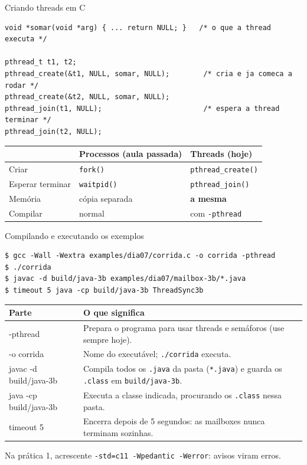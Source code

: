 \documentclass[aspectratio=169]{beamer}
\begin{document}
\begin{frame}[fragile]{Criando threads em C}
\begin{lstlisting}[style=codigo]
void *somar(void *arg) { ... return NULL; }   /* o que a thread executa */

pthread_t t1, t2;
pthread_create(&t1, NULL, somar, NULL);        /* cria e ja comeca a rodar */
pthread_create(&t2, NULL, somar, NULL);
pthread_join(t1, NULL);                        /* espera a thread terminar */
pthread_join(t2, NULL);
\end{lstlisting}

\begin{center}
\footnotesize
\begin{tabular}{@{}lll@{}}
\toprule
& \textbf{Processos (aula passada)} & \textbf{Threads (hoje)} \\
\midrule
Criar & \texttt{fork()} & \texttt{pthread\_create()} \\
Esperar terminar & \texttt{waitpid()} & \texttt{pthread\_join()} \\
Memória & cópia separada & \textbf{a mesma} \\
Compilar & normal & com \texttt{-pthread} \\
\bottomrule
\end{tabular}
\end{center}
\end{frame}

\begin{frame}[fragile]{Compilando e executando os exemplos}
\begin{lstlisting}[style=terminal, basicstyle=\ttfamily\scriptsize\color{termfg}]
$ gcc -Wall -Wextra examples/dia07/corrida.c -o corrida -pthread
$ ./corrida
$ javac -d build/java-3b examples/dia07/mailbox-3b/*.java
$ timeout 5 java -cp build/java-3b ThreadSync3b
\end{lstlisting}

\begin{center}
\scriptsize
\begin{tabular}{@{}>{\ttfamily}l>{\raggedright\arraybackslash}p{9.2cm}@{}}
\toprule
\textrm{\textbf{Parte}} & \textbf{O que significa} \\
\midrule
-pthread & Prepara o programa para usar threads e semáforos (use sempre hoje). \\
-o corrida & Nome do executável; \texttt{./corrida} executa. \\
javac -d build/java-3b & Compila todos os \texttt{.java} da pasta (\texttt{*.java}) e guarda os \texttt{.class} em \texttt{build/java-3b}. \\
java -cp build/java-3b & Executa a classe indicada, procurando os \texttt{.class} nessa pasta. \\
timeout 5 & Encerra depois de 5 segundos: as mailboxes nunca terminam sozinhas. \\
\bottomrule
\end{tabular}
\end{center}

\scriptsize Na prática 1, acrescente \texttt{-std=c11 -Wpedantic -Werror}: avisos viram erros.
\end{frame}
\end{document}
